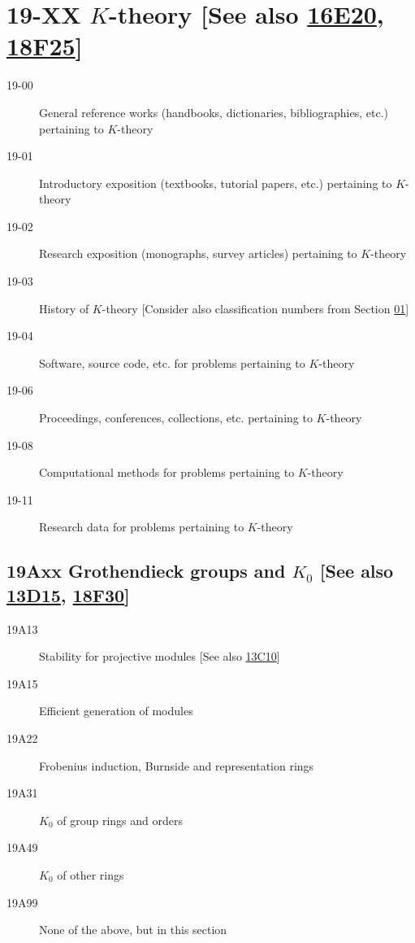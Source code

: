 \section*{19-XX $K$-theory [See also \hyperref[16E20]{16E20}, \hyperref[18F25]{18F25}] }\label{19-XX}
\begin{description}
\item [19-00]\label{19-00} General reference works (handbooks, dictionaries, bibliographies, etc.) pertaining to $K$-theory
\item [19-01]\label{19-01} Introductory exposition (textbooks, tutorial papers, etc.) pertaining to $K$-theory
\item [19-02]\label{19-02} Research exposition (monographs, survey articles) pertaining to $K$-theory
\item [19-03]\label{19-03} History of $K$-theory [Consider also classification numbers from Section \hyperref[01-XX]{01}]
\item [19-04]\label{19-04} Software, source code, etc. for problems pertaining to $K$-theory
\item [19-06]\label{19-06} Proceedings, conferences, collections, etc. pertaining to $K$-theory
\item [19-08]\label{19-08} Computational methods for problems pertaining to $K$-theory
\item [19-11]\label{19-11} Research data for problems pertaining to $K$-theory
\end{description}
\subsection*{19Axx  Grothendieck groups and $K_0$ [See also \hyperref[13D15]{13D15}, \hyperref[18F30]{18F30}] }\label{19Axx}
\begin{description}  
\item [19A13]\label{19A13} Stability for projective modules [See also \hyperref[13C10]{13C10}]
\item [19A15]\label{19A15} Efficient generation of modules
\item [19A22]\label{19A22} Frobenius induction, Burnside and representation rings
\item [19A31]\label{19A31} $K_0$ of group rings and orders
\item [19A49]\label{19A49} $K_0$ of other rings
\item [19A99]\label{19A99} None of the above, but in this section
\end{description}
